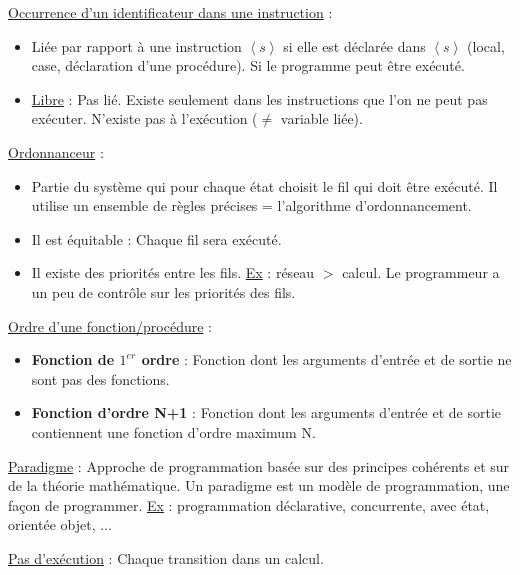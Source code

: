 \documentclass[fr,license=none,skiptoc]{../../../eplsummary}
\begin{document}
\begin{flushleft}
\textcolor{mauvedef}{\underline{Occurrence d’un identificateur dans une instruction}} :

\begin{itemize}
\item Liée par rapport à une instruction \textcolor{miorangerouge}{$\left\langle s \right\rangle$} si elle est déclarée dans \textcolor{miorangerouge}{$\left\langle s \right\rangle$} (local, case, déclaration d’une procédure). Si le programme peut être exécuté.
\item \underline{Libre} : Pas lié. Existe seulement dans les instructions que l’on ne peut pas exécuter.  N’existe pas à l’exécution ($\ne$ variable liée).
\end{itemize} \bigbreak



\textcolor{mauvedef}{\underline{Ordonnanceur}} :

\begin{itemize}
\item Partie du système qui pour chaque état choisit le fil qui doit être exécuté. Il utilise un ensemble de règles précises = l’algorithme d’ordonnancement.
\item Il est équitable : Chaque fil sera exécuté.
\item Il existe des priorités entre les fils. \underline{Ex} : réseau $>$ calcul. Le programmeur a un peu de contrôle sur les priorités des fils.
\end{itemize} \bigbreak


\textcolor{mauvedef}{\underline{Ordre d'une fonction/procédure}} :

\begin{itemize}
\item \textbf{Fonction de $1^{er}$ ordre} : Fonction dont les arguments d'entrée et de sortie ne sont pas des fonctions.
\item \textbf{Fonction d'ordre N+1} : Fonction dont les arguments d'entrée et de sortie contiennent une fonction d'ordre maximum N.
\end{itemize} \bigbreak


\textcolor{mauvedef}{\underline{Paradigme}} : Approche de programmation basée sur des principes cohérents et sur de la théorie mathématique. Un paradigme est un modèle de programmation, une façon de programmer. \underline{Ex} : programmation déclarative, concurrente, avec état, orientée objet, ...\bigbreak




\textcolor{mauvedef}{\underline{Pas d’exécution}} : Chaque transition dans un calcul. \bigbreak


\end{flushleft}
\end{document}
